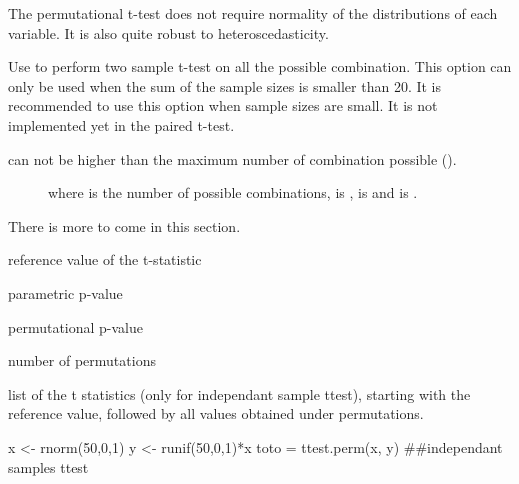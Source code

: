 \documentclass[a4paper]{book}
\begin{document}
%
\begin{Details}\relax
The permutational t-test does not require normality of the distributions of each variable.
It is also quite robust to heteroscedasticity.

Use  to perform two sample t-test on all the possible combination.
This option can only be used when the sum of the sample sizes  is smaller than 20.
It is recommended to use this option when sample sizes are small.
It is not implemented yet in the paired t-test.

 can not be higher than the maximum number of combination possible ().

\begin{description}

\item[] 


where  is the number of possible combinations, 
is ,  is
 and  is
.
\end{description}


There is more to come in this section.

\end{Details}
%
\begin{Value}
\begin{ldescription}
\item[\code{t.ref }] reference value of the t-statistic
\item[\code{p.param }] parametric p-value
\item[\code{p.perm }] permutational p-value
\item[\code{nperm }] number of permutations
\item[\code{perm.t }] list of the t statistics (only for independant sample ttest), starting with the reference value, followed by all values obtained under permutations.
\end{ldescription}
\end{Value}
%
\begin{Examples}
\begin{ExampleCode}
x <- rnorm(50,0,1)
y <- runif(50,0,1)*x
toto = ttest.perm(x, y)  ##independant samples ttest
\end{ExampleCode}
\end{Examples}
\newpage
\end{document}
